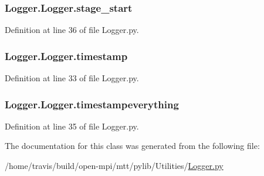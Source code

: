 \hypertarget{class_logger_1_1_logger_a639adf5e0d4f73bdb942e9652903231f}{
\subsubsection[{stage\-\_\-start}]{\setlength{\rightskip}{0pt plus 5cm}Logger.\-Logger.\-stage\-\_\-start}}\label{class_logger_1_1_logger_a639adf5e0d4f73bdb942e9652903231f}


Definition at line 36 of file Logger.\-py.

\hypertarget{class_logger_1_1_logger_af1d68b73fec8eebd0abeafa3bc8fd98b}{
\subsubsection[{timestamp}]{\setlength{\rightskip}{0pt plus 5cm}Logger.\-Logger.\-timestamp}}\label{class_logger_1_1_logger_af1d68b73fec8eebd0abeafa3bc8fd98b}


Definition at line 33 of file Logger.\-py.

\hypertarget{class_logger_1_1_logger_a6012f50ab21e5ab3b89465a972b6a99d}{
\subsubsection[{timestampeverything}]{\setlength{\rightskip}{0pt plus 5cm}Logger.\-Logger.\-timestampeverything}}\label{class_logger_1_1_logger_a6012f50ab21e5ab3b89465a972b6a99d}


Definition at line 35 of file Logger.\-py.



The documentation for this class was generated from the following file\-:\begin{DoxyCompactItemize}
\item 
/home/travis/build/open-\/mpi/mtt/pylib/\-Utilities/\hyperlink{_logger_8py}{Logger.\-py}\end{DoxyCompactItemize}
